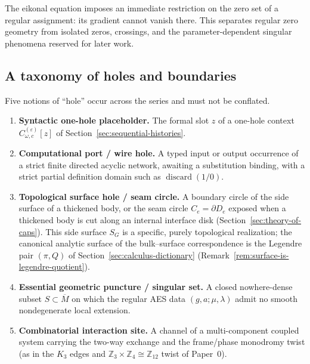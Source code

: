 The eikonal equation imposes an immediate restriction on the zero set of a regular
assignment: its gradient cannot vanish there.  This separates regular zero geometry
from isolated zeros, crossings, and the parameter-dependent singular phenomena
reserved for later work.

\subsection{A taxonomy of holes and boundaries}

Five notions of ``hole'' occur across the series and must not be conflated.

\begin{definition}
\label{def:fivefold-hole-taxonomy}
\begin{enumerate}
  \item \textbf{Syntactic one-hole placeholder.} The formal slot $z$ of a
  one-hole context $C_{\omega,c}^{(\varepsilon)}[z]$ of
  Section~\ref{sec:sequential-histories}.
  \item \textbf{Computational port / wire hole.} A typed input or output
  occurrence of a strict finite directed acyclic network, awaiting a
  substitution binding, with a strict partial definition domain such as
  $\operatorname{discard}(1/0)$.
  \item \textbf{Topological surface hole / seam circle.} A boundary circle of
  the side surface of a thickened body, or the seam circle $C_e=\partial D_e$
  exposed when a thickened body is cut along an internal interface disk
  (Section~\ref{sec:theory-of-caps}).  This side surface $S_G$ is a specific,
  purely topological realization; the canonical analytic surface of the
  bulk--surface correspondence is the Legendre pair $(\pi,Q)$ of
  Section~\ref{sec:calculus-dictionary}
  (Remark~\ref{rem:surface-is-legendre-quotient}).
  \item \textbf{Essential geometric puncture / singular set.} A closed
  nowhere-dense subset $S\subset\overline M$ on which the regular AES data
  $(g,a;\mu,\lambda)$ admit no smooth nondegenerate local extension.
  \item \textbf{Combinatorial interaction site.} A channel of a multi-component
  coupled system carrying the two-way exchange and the frame/phase monodromy
  twist (as in the $K_3$ edges and $\mathbb Z_3\times\mathbb Z_4\cong\mathbb Z_{12}$
  twist of Paper~0).
\end{enumerate}
\end{definition}

